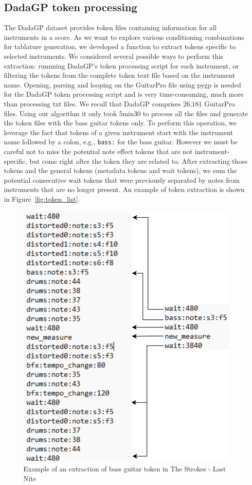 \subsection{DadaGP token processing}

The DadaGP dataset provides token files containing information for all instruments in a score.
As we want to explore various conditioning combinations for tablature generation, we developed a function to extract tokens specific to selected instruments.
We considered several possible ways to perform this extraction: runnning DadaGP's token processing script for each instrument, or filtering the tokens from the complete token text file based on the instrument name.
Opening, parsing and looping on the GuitarPro file using pygp is needed for the DadaGP token processing script and is very time-consuming, much more than processing txt files.
We recall that DadaGP comprises 26,181 GuitarPro files. Using our algorithm it only took 5min30 to process all the files and generate the token files with the bass guitar tokens only.
To perform this operation, we leverage the fact that tokens of a given instrument start with the instrument name followed by a colon, e.g., \texttt{bass:} for the bass guitar.
However we must be careful not to miss the potential note effect tokens that are not instrument-specific, but come right after the token they are related to.
After extracting those tokens and the general tokens (metadata tokens and wait tokens),
we sum the potential consecutive wait tokens that were previously separated by notes from instruments that are no longer present.
An example of token extraction is shown in Figure~\ref{fig:token_list}.

\begin{figure}[!ht]
    \centering
    \includegraphics[width=.5\linewidth]{../images-figures/token_extraction.png}
    \caption{Example of an extraction of bass guitar token in The Strokes - Last Nite}
    \label{fig:token_extraction}
\end{figure}


